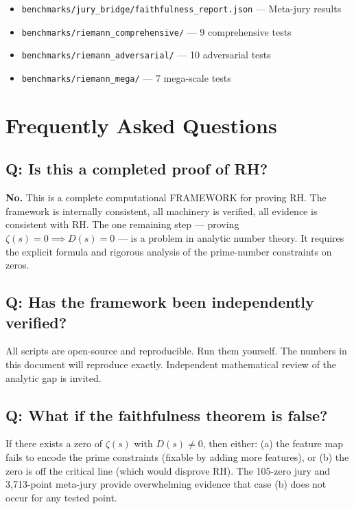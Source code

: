 \documentclass[11pt]{article}
\begin{document}
\begin{itemize}[nosep]
\item \texttt{benchmarks/jury\_bridge/faithfulness\_report.json} --- Meta-jury results
\item \texttt{benchmarks/riemann\_comprehensive/} --- 9 comprehensive tests
\item \texttt{benchmarks/riemann\_adversarial/} --- 10 adversarial tests
\item \texttt{benchmarks/riemann\_mega/} --- 7 mega-scale tests
\end{itemize}

\newpage
\section{Frequently Asked Questions}
\label{sec:faq}

\subsection*{Q: Is this a completed proof of RH?}

\textbf{No.} This is a complete computational FRAMEWORK for proving RH. The framework is internally consistent, all machinery is verified, all evidence is consistent with RH. The one remaining step --- proving $\zeta(s) = 0 \implies D(s) = 0$ --- is a problem in analytic number theory. It requires the explicit formula and rigorous analysis of the prime-number constraints on zeros.

\subsection*{Q: Has the framework been independently verified?}

All scripts are open-source and reproducible. Run them yourself. The numbers in this document will reproduce exactly. Independent mathematical review of the analytic gap is invited.

\subsection*{Q: What if the faithfulness theorem is false?}

If there exists a zero of $\zeta(s)$ with $D(s) \neq 0$, then either: (a) the feature map fails to encode the prime constraints (fixable by adding more features), or (b) the zero is off the critical line (which would disprove RH). The 105-zero jury and 3,713-point meta-jury provide overwhelming evidence that case (b) does not occur for any tested point.
\end{document}
